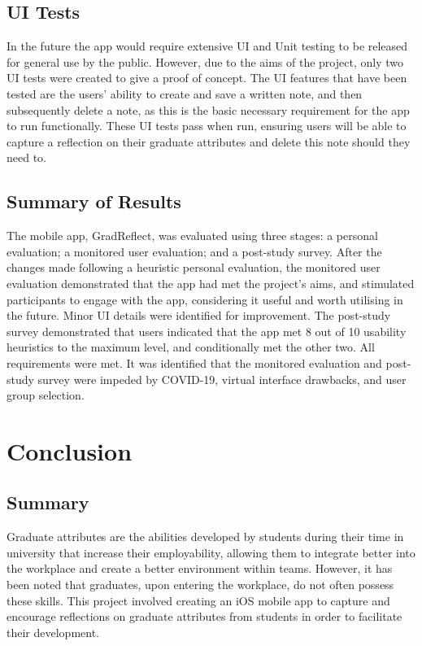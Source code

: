 \documentclass{l4proj}
\begin{document}
\section{UI Tests}

In the future the app would require extensive UI and Unit testing to be released for general use by the public. However, due to the aims of the project, only two UI tests were created to give a proof of concept. The UI features that have been tested are the users' ability to create and save a written note, and then subsequently delete a note, as this is the basic necessary requirement for the app to run functionally. These UI tests pass when run, ensuring users will be able to capture a reflection on their graduate attributes and delete this note should they need to.

\section{Summary of Results}

The mobile app, GradReflect, was evaluated using three stages: a personal evaluation; a monitored user evaluation; and a post-study survey. After the changes made following a heuristic personal evaluation, the monitored user evaluation demonstrated that the app had met the project’s aims, and stimulated participants to engage with the app, considering it useful and worth utilising in the future. Minor UI details were identified for improvement. The post-study survey demonstrated that users indicated that the app met 8 out of 10 usability heuristics to the maximum level, and conditionally met the other two. All requirements were met. It was identified that the monitored evaluation and post-study survey were impeded by COVID-19, virtual interface drawbacks, and user group selection.


\chapter{Conclusion}  

\section{Summary}

Graduate attributes are the abilities developed by students during their time in university that increase their employability, allowing them to integrate better into the workplace and create a better environment within teams. However, it has been noted that graduates, upon entering the workplace, do not often possess these skills. This project involved creating an iOS mobile app to capture and encourage reflections on graduate attributes from students in order to facilitate their development.
\end{document}

